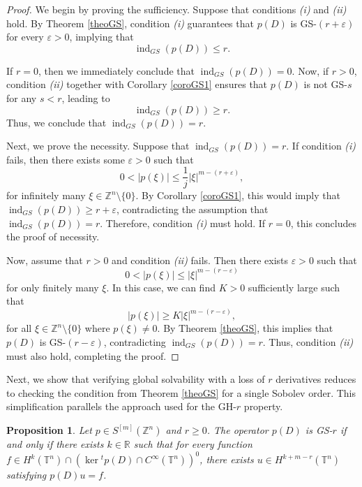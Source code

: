 \documentclass[11pt]{amsart}
\numberwithin{equation}{section}
\newtheorem{proposition}[theorem]{Proposition}
\theoremstyle{definition}
\begin{document}
	
	\begin{proof}
		We begin by proving the sufficiency. Suppose that conditions {\it (i)} and {\it (ii)} hold. By Theorem \ref{theoGS}, condition {\it (i)} guarantees that \( p(D) \) is GS-\( (r + \varepsilon) \) for every \( \varepsilon > 0 \), implying that  
		\[
		\operatorname{ind}_{GS}(p(D)) \leq r.
		\]
		
		If \( r = 0 \), then we immediately conclude that \( \operatorname{ind}_{GS}(p(D)) = 0 \). Now, if \( r > 0 \), condition {\it (ii)} together with Corollary \ref{coroGS1} ensures that \( p(D) \) is not GS-\( s \) for any \( s < r \), leading to  
		\[
		\operatorname{ind}_{GS}(p(D)) \geq r.
		\]
		Thus, we conclude that \( \operatorname{ind}_{GS}(p(D)) = r \).
		
		\medskip
		Next, we prove the necessity. Suppose that \( \operatorname{ind}_{GS}(p(D)) = r \). If condition {\it (i)} fails, then there exists some \( \varepsilon > 0 \) such that 
		\begin{equation*}
			0<|p(\xi)| \leq \frac{1}{j} |\xi|^{m - (r + \varepsilon)},
		\end{equation*}
        for infinitely many \( \xi \in \mathbb{Z}^n \setminus \{0\} \). By Corollary \ref{coroGS1}, this would imply that \( \operatorname{ind}_{GS}(p(D)) \geq r + \varepsilon \), contradicting the assumption that \( \operatorname{ind}_{GS}(p(D)) = r \). Therefore, condition {\it (i)} must hold. If $r=0$, this concludes the proof of necessity.
		
		Now, assume that \( r > 0 \) and condition {\it (ii)} fails. Then there exists \( \varepsilon > 0 \) such that  
		\[
		0<|p(\xi)| \leq |\xi|^{m - (r - \varepsilon)}
		\]
	 for only finitely many \( \xi \). In this case, we can find \( K > 0 \) sufficiently large such that  
		\[
		|p(\xi)| \geq K |\xi|^{m - (r - \varepsilon)},
		\]
		for all \( \xi \in \mathbb{Z}^n \setminus \{0\} \) where \( p(\xi) \neq 0 \). By Theorem \ref{theoGS}, this implies that \( p(D) \) is GS-\( (r - \varepsilon) \), contradicting \( \operatorname{ind}_{GS}(p(D)) = r \). Thus, condition {\it (ii)} must also hold, completing the proof.
	\end{proof}
	

	Next, we show that verifying global solvability with a loss of \( r \) derivatives reduces to checking the condition from Theorem \ref{theoGS} for a single Sobolev order. This simplification parallels the approach used for the GH-\( r \) property.
	
	\begin{proposition}\label{prop_single_sobolev_order_GS}
		Let \( p \in S^{[m]}(\mathbb{Z}^n) \) and \( r \geq 0 \). The operator \( p(D) \) is GS-\( r \) if and only if there exists  \( k \in \mathbb{R} \) such that for every function \( f \in H^k(\mathbb{T}^n) \cap \left( \ker {}^t p(D) \cap C^\infty(\mathbb{T}^n) \right)^0 \), there exists \( u \in H^{k + m - r}(\mathbb{T}^n) \) satisfying \( p(D)u = f \).
	\end{proposition}
	
\end{document}
